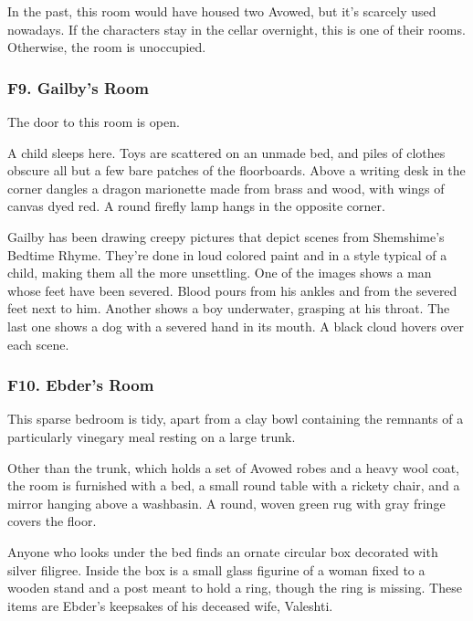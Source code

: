 \documentclass[10pt,a4paper,twoside,bg=print,twocolumn,openany,nodeprecatedcode]{dndbook}
\begin{document}
In the past, this room would have housed two Avowed, but it's scarcely used nowadays. If the characters stay in the cellar overnight, this is one of their rooms. Otherwise, the room is unoccupied.

\subsubsection{F9. Gailby's Room}
The door to this room is open.

\begin{DndReadAloud}{}
A child sleeps here. Toys are scattered on an unmade bed, and piles of clothes obscure all but a few bare patches of the floorboards. Above a writing desk in the corner dangles a dragon marionette made from brass and wood, with wings of canvas dyed red. A round firefly lamp hangs in the opposite corner.

\end{DndReadAloud}

Gailby has been drawing creepy pictures that depict scenes from Shemshime's Bedtime Rhyme. They're done in loud colored paint and in a style typical of a child, making them all the more unsettling. One of the images shows a man whose feet have been severed. Blood pours from his ankles and from the severed feet next to him. Another shows a boy underwater, grasping at his throat. The last one shows a dog with a severed hand in its mouth. A black cloud hovers over each scene.

\subsubsection{F10. Ebder's Room}
\begin{DndReadAloud}{}
This sparse bedroom is tidy, apart from a clay bowl containing the remnants of a particularly vinegary meal resting on a large trunk.

\end{DndReadAloud}

Other than the trunk, which holds a set of Avowed robes and a heavy wool coat, the room is furnished with a bed, a small round table with a rickety chair, and a mirror hanging above a washbasin. A round, woven green rug with gray fringe covers the floor.

Anyone who looks under the bed finds an ornate circular box decorated with silver filigree. Inside the box is a small glass figurine of a woman fixed to a wooden stand and a post meant to hold a ring, though the ring is missing. These items are Ebder's keepsakes of his deceased wife, Valeshti.
\end{document}
